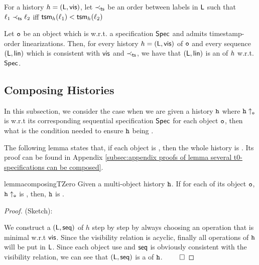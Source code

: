 For a history ${h}=(\mathsf{L},\mathsf{vis})$, let $\prec_{\mathsf{ts}}$ be an order between labels in $\mathsf{L}$ such that $\ell_1\prec_{\mathsf{ts}}\ell_2$ iff $\mathsf{tsm}_{{h}}(\ell_1) < \mathsf{tsm}_{{h}}(\ell_2)$

\begin{lemma}
Let $\mathtt{o}$ be an object which is \crdtlinearizable{} w.r.t. a specification $\mathsf{Spec}$ and admits timestamp-order linearizations. Then, for every history ${h}=(\mathsf{L},\mathsf{vis})$ of $\mathtt{o}$ and every sequence $(\mathsf{L},\mathsf{lin})$ which is consistent with $\mathsf{vis}$ and $\prec_{\mathsf{ts}}$, we have that $(\mathsf{L},\mathsf{lin})$ is an \crdtlinearization{} of ${h}$ w.r.t. $\mathsf{Spec}$.
\end{lemma}




\subsection{Composing Histories}
\label{lemma:composing histories}

In this subsection, we consider the case when we are given a history $\mathtt{h}$ where $\mathtt{h} \uparrow_{\mathtt{o}}$ is \crdtlinearizable{} w.r.t its corresponding sequential specification $\mathsf{Spec}{}$ for each object $\mathtt{o}$, then what is the condition needed to ensure $\mathtt{h}$ being \crdtlinearizable.

The following lemma states that, if each object is \tzerolinearizable{}, then the whole history is \crdtlinearizable{}. Its proof can be found in Appendix \ref{subsec:appendix proofs of lemma several t0-specifications can be composed}.

\begin{restatable}{lemma}{composingTZero}
\label{lemma:several t0-specifications can be composed}
Given a multi-object history $\mathtt{h}$. If for each of its object $\mathtt{o}$, $\mathtt{h} \uparrow_{\mathtt{o}}$ is \tzerolinearizable{}, then, $\mathtt{h}$ is \crdtlinearizable{}.
\end{restatable}

\begin {proof} (Sketch):

We construct a \crdtlinearization $(\mathsf{L}, \mathsf{seq})$ of $h$ step by step by always choosing an operation that is minimal w.r.t $\mathsf{vis}$. Since the visibility relation is acyclic, finally all operations of $\mathtt{h}$ will be put in $\mathsf{L}$. Since each object use \tzerolin{} and $\mathsf{seq}$ is obviously consistent with the visibility relation, we can see that $(\mathsf{L}, \mathsf{seq})$ is a \crdtlinearization of $\mathtt{h}$. $\qed$
\end {proof}


